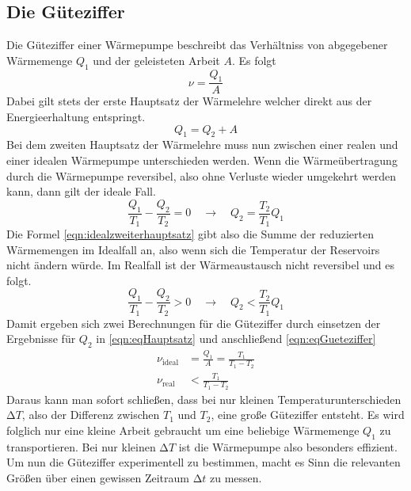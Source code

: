 \subsection{Die Güteziffer}
\label{sec:Gueteziffer}
Die Güteziffer einer Wärmepumpe beschreibt das Verhältniss von abgegebener Wärmemenge $Q_{1}$ und der geleisteten Arbeit $A$. Es folgt
\begin{equation}
\label{eqn:eqGueteziffer}
\nu = \frac{Q_{1}}{A}
\end{equation}
Dabei gilt stets der erste Hauptsatz der Wärmelehre welcher direkt aus der Energieerhaltung entspringt.
\begin{equation}
\label{eqn:eqHauptsatz}
Q_{1} = Q_{2} + A
\end{equation}
Bei dem zweiten Hauptsatz der Wärmelehre muss nun zwischen einer realen und einer idealen Wärmepumpe unterschieden werden.
Wenn die Wärmeübertragung durch die Wärmepumpe reversibel, also ohne Verluste wieder umgekehrt werden kann, dann gilt der ideale Fall.
\begin{equation}
\label{eqn:idealzweiterhauptsatz}
\frac{Q_{1}}{T_{1}} - \frac{Q_{2}}{T_{2}} = 0 \quad \to \quad Q_{2} = \frac{T_{2}}{T_{1}} Q_{1}
\end{equation}
Die Formel \eqref{eqn:idealzweiterhauptsatz} gibt also die Summe der reduzierten Wärmemengen im Idealfall an, also wenn sich die Temperatur der Reservoirs nicht ändern würde.
Im Realfall ist der Wärmeaustausch nicht reversibel und es folgt.
\begin{equation}
\label{eqn:realzweiterhauptsatz}
\frac{Q_{1}}{T_{1}} - \frac{Q_{2}}{T_{2}} > 0 \quad \to \quad Q_{2} < \frac{T_{2}}{T_{1}} Q_{1}
\end{equation}
Damit ergeben sich zwei Berechnungen für die Güteziffer durch einsetzen der Ergebnisse für $Q_{2}$ in \eqref{eqn:eqHauptsatz} und anschließend \eqref{eqn:eqGueteziffer}
\begin{align}
\nu_{\text{ideal}} &= \frac{Q_{1}}{A} = \frac{T_{1}}{T_{1}-T_{2}} \\
\nu_{\text{real}} &< \frac{T_{1}}{T_{1}-T_{2}}
\end{align}
Daraus kann man sofort schließen, dass bei nur kleinen Temperaturunterschieden $\increment T$, also der Differenz zwischen $T_{1}$ und $T_{2}$, eine große Güteziffer
entsteht. Es wird folglich nur eine kleine Arbeit gebraucht um eine beliebige Wärmemenge $Q_{1}$ zu transportieren. Bei nur kleinen $\increment T$ ist die Wärmepumpe also 
besonders effizient.
Um nun die Güteziffer experimentell zu bestimmen, macht es Sinn die relevanten Größen über einen gewissen Zeitraum $\increment t$ zu messen.
